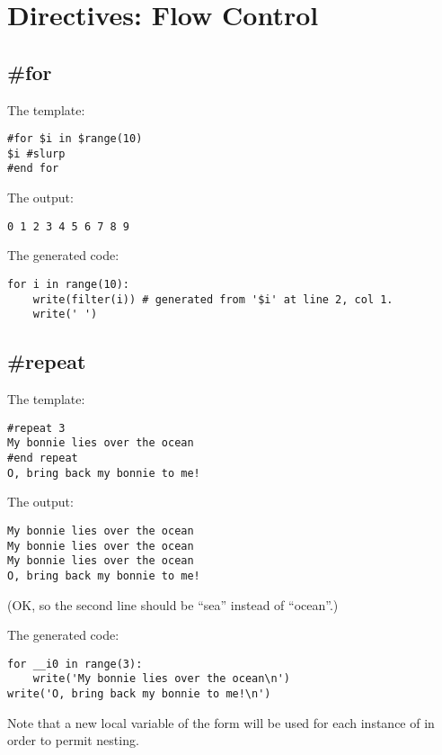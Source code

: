 \section{Directives: Flow Control}
\label{flowControl}

\subsection{\#for}
\label{flowControl.for}

The template:
\begin{verbatim}
#for $i in $range(10)
$i #slurp
#end for
\end{verbatim}

The output:
\begin{verbatim}
0 1 2 3 4 5 6 7 8 9 
\end{verbatim}

The generated code:
\begin{verbatim}
for i in range(10):
    write(filter(i)) # generated from '$i' at line 2, col 1.
    write(' ')
\end{verbatim}

\subsection{\#repeat}
\label{flowControl.repeat}

The template:
\begin{verbatim}
#repeat 3
My bonnie lies over the ocean
#end repeat
O, bring back my bonnie to me!
\end{verbatim}

The output:
\begin{verbatim}
My bonnie lies over the ocean
My bonnie lies over the ocean
My bonnie lies over the ocean
O, bring back my bonnie to me!
\end{verbatim}
(OK, so the second line should be ``sea'' instead of ``ocean''.)

The generated code:
\begin{verbatim}
for __i0 in range(3):
    write('My bonnie lies over the ocean\n')
write('O, bring back my bonnie to me!\n')
\end{verbatim}

Note that a new local variable of the form  will be
used for each instance of  in order to permit nesting.

